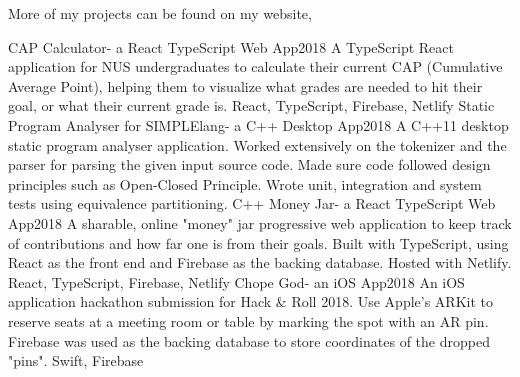 %
%
%

\begin{center}
	More of my projects can be found on my website, 
\end{center}

\begin{projects}
	\project
	{CAP Calculator}{- a React TypeScript Web App}{2018}
	{  }
	{A TypeScript React application for NUS undergraduates to calculate their current CAP (Cumulative Average Point), helping them to visualize what grades are needed to hit their goal, or what their current grade is.}
	{React, TypeScript, Firebase, Netlify}
	\project
	{Static Program Analyser for SIMPLElang}{- a C++ Desktop App}{2018}
	{}
	{A C++11 desktop static program analyser application. Worked extensively on the tokenizer and the parser for parsing the given input source code. Made sure code followed design principles such as Open-Closed Principle. Wrote unit, integration and system tests using equivalence partitioning.}
	{C++}
	\project
	{Money Jar}{- a React TypeScript Web App}{2018}
	{  }
	{A sharable, online "money" jar progressive web application to keep track of contributions and how far one is from their goals. Built with TypeScript, using React as the front end and Firebase as the backing database. Hosted with Netlify.}
	{React, TypeScript, Firebase, Netlify}
	\project
	{Chope God}{- an iOS App}{2018}
	{}
	{An iOS application hackathon submission for Hack \& Roll 2018. Use Apple’s ARKit to reserve seats at a meeting room or table by marking the spot with an AR pin.  Firebase was used as the backing database to store coordinates of the dropped "pins".}
	{Swift, Firebase}
\end{projects}
